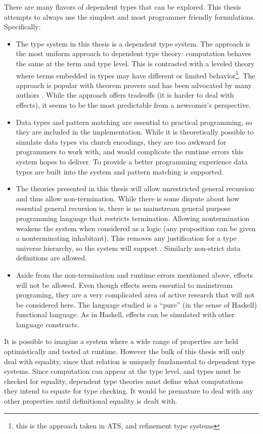 There are many flavors of dependent types that can be explored.
This thesis attempts to always use the simplest and most programmer friendly formulations.
Specifically:
\begin{itemize}
\item The type system in this thesis is a \textbf{\fullSp{}} dependent type system.
The \fullSp{} approach is the most uniform approach to dependent type theory: computation behaves the same at the term and type level.
This is contrasted with a leveled theory where terms embedded in types may have different or limited behavior\footnote{
  this is the approach taken in ATS, and refinement type systems}.
The \fullSp{} approach is popular with theorem provers and has been advocated by many authors \cite{10.1145/289423.289451,norell2007towards,brady2013idris,sjoberg2012irrelevance}.
While the \fullSp{} approach offers tradeoffs (it is harder to deal with effects), it seems to be the most predictable from a newcomer's perspective.
\item Data types and pattern matching are essential to practical programming, so they are included in the implementation.
While it is theoretically possible to simulate data types via church encodings, they are too awkward for programmers to work with, and would complicate the runtime errors this system hopes to deliver.
To provide a better programming experience data types are built into the system and pattern matching is supported.
\item The theories presented in this thesis will allow unrestricted general recursion and thus allow non-termination.
While there is some dispute about how essential general recursion is,
there is no mainstream general purpose programming language that restricts termination.
Allowing nontermination weakens the system when considered as a logic (any proposition can be given a nonterminating inhabitant).
This removes any justification for a type universe hierarchy, so the system will support \tit{}.
Similarly non-strict data definitions are allowed.
\item Aside from the non-termination and runtime errors mentioned above, effects will not be allowed.
Even though effects seem essential to mainstream programing, they are a very complicated area of active research that will not be considered here.
The language studied is a ``pure'' (in the sense of Haskell) functional language.
As in Haskell, effects can be simulated with other language constructs.
\end{itemize}
It is possible to imagine a system where a wide range of properties are held optimistically and tested at runtime.
However the bulk of this thesis will only deal with equality, since that relation is uniquely fundamental to dependent type systems.
Since computation can appear at the type level, and types must be checked for equality, dependent type theories must define what computations they intend to equate for type checking.
It would be premature to deal with any other properties until definitional equality is dealt with.

